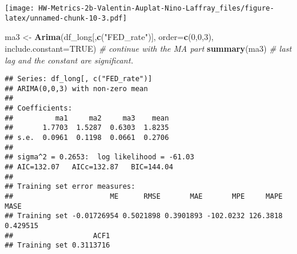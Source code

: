 \documentclass[
]{article}
\newenvironment{Shaded}{\begin{snugshade}}{\end{snugshade}}
\newcommand{\AttributeTok}[1]{\textcolor[rgb]{0.13,0.29,0.53}{#1}}
\newcommand{\CommentTok}[1]{\textcolor[rgb]{0.56,0.35,0.01}{\textit{#1}}}
\newcommand{\ConstantTok}[1]{\textcolor[rgb]{0.56,0.35,0.01}{#1}}
\newcommand{\DecValTok}[1]{\textcolor[rgb]{0.00,0.00,0.81}{#1}}
\newcommand{\FunctionTok}[1]{\textcolor[rgb]{0.13,0.29,0.53}{\textbf{#1}}}
\newcommand{\NormalTok}[1]{#1}
\newcommand{\OtherTok}[1]{\textcolor[rgb]{0.56,0.35,0.01}{#1}}
\newcommand{\SpecialCharTok}[1]{\textcolor[rgb]{0.81,0.36,0.00}{\textbf{#1}}}
\newcommand{\StringTok}[1]{\textcolor[rgb]{0.31,0.60,0.02}{#1}}
\begin{document}
\texttt{[image: HW-Metrics-2b-Valentin-Auplat-Nino-Laffray\_files/figure-latex/unnamed-chunk-10-3.pdf]}

\begin{Shaded}
\begin{Highlighting}[]
\NormalTok{ma3 }\OtherTok{\textless{}{-}} \FunctionTok{Arima}\NormalTok{(df\_long[,}\FunctionTok{c}\NormalTok{(}\StringTok{"FED\_rate"}\NormalTok{)], }\AttributeTok{order=}\FunctionTok{c}\NormalTok{(}\DecValTok{0}\NormalTok{,}\DecValTok{0}\NormalTok{,}\DecValTok{3}\NormalTok{), }\AttributeTok{include.constant=}\ConstantTok{TRUE}\NormalTok{) }\CommentTok{\# continue with the MA part}
\FunctionTok{summary}\NormalTok{(ma3) }\CommentTok{\# last lag and the constant are significant.}
\end{Highlighting}
\end{Shaded}

\begin{verbatim}
## Series: df_long[, c("FED_rate")] 
## ARIMA(0,0,3) with non-zero mean 
## 
## Coefficients:
##          ma1     ma2     ma3    mean
##       1.7703  1.5287  0.6303  1.8235
## s.e.  0.0961  0.1198  0.0661  0.2706
## 
## sigma^2 = 0.2653:  log likelihood = -61.03
## AIC=132.07   AICc=132.87   BIC=144.04
## 
## Training set error measures:
##                       ME      RMSE       MAE       MPE     MAPE     MASE
## Training set -0.01726954 0.5021898 0.3901893 -102.0232 126.3818 0.429515
##                   ACF1
## Training set 0.3113716
\end{verbatim}

\begin{Shaded}
\end{Shaded}
\end{document}
